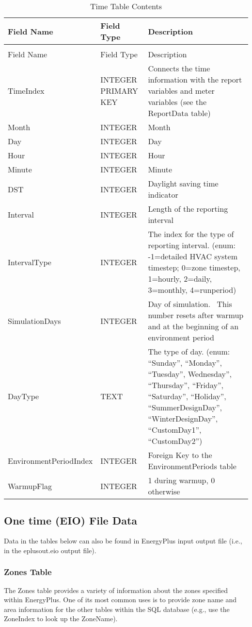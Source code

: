 \begin{longtable}[c]{>{\raggedright}p{1.5in}>{\raggedright}p{1.5in}>{\raggedright}p{3.0in}}
\caption{Time Table Contents \label{table:table-10.-time-table-contents}} \tabularnewline
\toprule 
Field Name & Field Type & Description \tabularnewline
\midrule
\endfirsthead

\caption[]{Time Table Contents} \tabularnewline
\toprule 
Field Name & Field Type & Description \tabularnewline
\midrule
\endhead

TimeIndex & INTEGER PRIMARY KEY & Connects the time information with the report variables and meter variables (see the ReportData table) \tabularnewline
Month & INTEGER & Month \tabularnewline
Day & INTEGER & Day \tabularnewline
Hour & INTEGER & Hour \tabularnewline
Minute & INTEGER & Minute \tabularnewline
DST & INTEGER & Daylight saving time indicator \tabularnewline
Interval & INTEGER & Length of the reporting interval \tabularnewline
IntervalType & INTEGER & The index for the type of reporting interval. (enum: -1=detailed HVAC system timestep; 0=zone timestep, 1=hourly, 2=daily, 3=monthly, 4=runperiod) \tabularnewline
SimulationDays & INTEGER & Day of simulation.~ This number resets after warmup and at the beginning of an environment period \tabularnewline
DayType & TEXT & The type of day. (enum: “Sunday”, “Monday”, “Tuesday”, Wednesday”, “Thursday”, “Friday”, “Saturday”, “Holiday”, “SummerDesignDay”, “WinterDesignDay”, “CustomDay1”, “CustomDay2”) \tabularnewline
Environment\-Period\-Index & INTEGER & Foreign Key to the EnvironmentPeriods table \tabularnewline
WarmupFlag & INTEGER & 1 during warmup, 0 otherwise \tabularnewline
\bottomrule
\end{longtable}

\subsection{One time (EIO) File Data}

Data in the tables below can also be found in EnergyPlus input output file (i.e., in the eplusout.eio output file).

\subsubsection{Zones Table}

The Zones table provides a variety of information about the zones specified within EnergyPlus. One of its most common uses is to provide zone name and area information for the other tables within the SQL database (e.g., use the ZoneIndex to look up the ZoneName).

